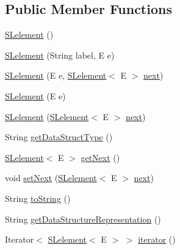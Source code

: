 \subsection*{Public Member Functions}
\begin{DoxyCompactItemize}
\item 
\mbox{\hyperlink{classbridges_1_1base_1_1_s_lelement_ab9c8a08dadd76d7e0c29d7c41cf277c4}{S\+Lelement}} ()
\item 
\mbox{\hyperlink{classbridges_1_1base_1_1_s_lelement_a8e32c9b9e8fc8f9f1eccb14b97e031e7}{S\+Lelement}} (String label, E e)
\item 
\mbox{\hyperlink{classbridges_1_1base_1_1_s_lelement_abc5e333fd2f3289eede108175908f97d}{S\+Lelement}} (E e, \mbox{\hyperlink{classbridges_1_1base_1_1_s_lelement}{S\+Lelement}}$<$ E $>$ \mbox{\hyperlink{classbridges_1_1base_1_1_s_lelement_abf61c96a74ad319d561c6952ea388e0e}{next}})
\item 
\mbox{\hyperlink{classbridges_1_1base_1_1_s_lelement_aa40c4c7bda4d7a852edb21a8ed537cae}{S\+Lelement}} (E e)
\item 
\mbox{\hyperlink{classbridges_1_1base_1_1_s_lelement_ab5b1c20ba1d1923fad0780052fb51c99}{S\+Lelement}} (\mbox{\hyperlink{classbridges_1_1base_1_1_s_lelement}{S\+Lelement}}$<$ E $>$ \mbox{\hyperlink{classbridges_1_1base_1_1_s_lelement_abf61c96a74ad319d561c6952ea388e0e}{next}})
\item 
String \mbox{\hyperlink{classbridges_1_1base_1_1_s_lelement_a8c48a2d34b238fa0ae7bf2d1ee58ea88}{get\+Data\+Struct\+Type}} ()
\item 
\mbox{\hyperlink{classbridges_1_1base_1_1_s_lelement}{S\+Lelement}}$<$ E $>$ \mbox{\hyperlink{classbridges_1_1base_1_1_s_lelement_a060c4671e05e3f20b16630343393b80d}{get\+Next}} ()
\item 
void \mbox{\hyperlink{classbridges_1_1base_1_1_s_lelement_afdd42f03071b2614822b73729e1a5a1a}{set\+Next}} (\mbox{\hyperlink{classbridges_1_1base_1_1_s_lelement}{S\+Lelement}}$<$ E $>$ \mbox{\hyperlink{classbridges_1_1base_1_1_s_lelement_abf61c96a74ad319d561c6952ea388e0e}{next}})
\item 
String \mbox{\hyperlink{classbridges_1_1base_1_1_s_lelement_af0ec4da5b29d0f5ab6ab38e91cca51f9}{to\+String}} ()
\item 
String \mbox{\hyperlink{classbridges_1_1base_1_1_s_lelement_a2928f5e8640deaceeecf01adcd75669b}{get\+Data\+Structure\+Representation}} ()
\item 
Iterator$<$ \mbox{\hyperlink{classbridges_1_1base_1_1_s_lelement}{S\+Lelement}}$<$ E $>$ $>$ \mbox{\hyperlink{classbridges_1_1base_1_1_s_lelement_a2ecf938707a8009f28dcb98112ede9d9}{iterator}} ()
\end{DoxyCompactItemize}
